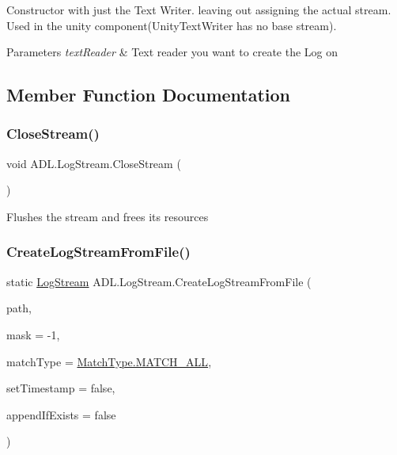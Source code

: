 Constructor with just the Text Writer. leaving out assigning the actual stream. Used in the unity component(\+Unity\+Text\+Writer has no base stream). 


\begin{DoxyParams}{Parameters}
{\em text\+Reader} & Text reader you want to create the Log on\\
\hline
\end{DoxyParams}


\subsection{Member Function Documentation}
\mbox{\label{class_a_d_l_1_1_log_stream_afd62c8127a7d8573621ac0c565ed62ac}} 
\subsubsection{\texorpdfstring{Close\+Stream()}{CloseStream()}}
{\footnotesize\ttfamily void A\+D\+L.\+Log\+Stream.\+Close\+Stream (\begin{DoxyParamCaption}{ }\end{DoxyParamCaption})}



Flushes the stream and frees its resources 

\mbox{\label{class_a_d_l_1_1_log_stream_a5369ad1bfec52a786117832f74454054}} 
\subsubsection{\texorpdfstring{Create\+Log\+Stream\+From\+File()}{CreateLogStreamFromFile()}}
{\footnotesize\ttfamily static \mbox{\hyperlink{class_a_d_l_1_1_log_stream}{Log\+Stream}} A\+D\+L.\+Log\+Stream.\+Create\+Log\+Stream\+From\+File (\begin{DoxyParamCaption}\item[{string}]{path,  }\item[{int}]{mask = {\ttfamily -\/1},  }\item[{\mbox{\hyperlink{namespace_a_d_l_af6334296dbae0383a652317263f0bc05}{Match\+Type}}}]{match\+Type = {\ttfamily \mbox{\hyperlink{namespace_a_d_l_af6334296dbae0383a652317263f0bc05a627c7991c5d0265194247e92fcf120b0}{Match\+Type.\+M\+A\+T\+C\+H\+\_\+\+A\+LL}}},  }\item[{bool}]{set\+Timestamp = {\ttfamily false},  }\item[{bool}]{append\+If\+Exists = {\ttfamily false} }\end{DoxyParamCaption})\hspace{0.3cm}{\ttfamily [static]}}




